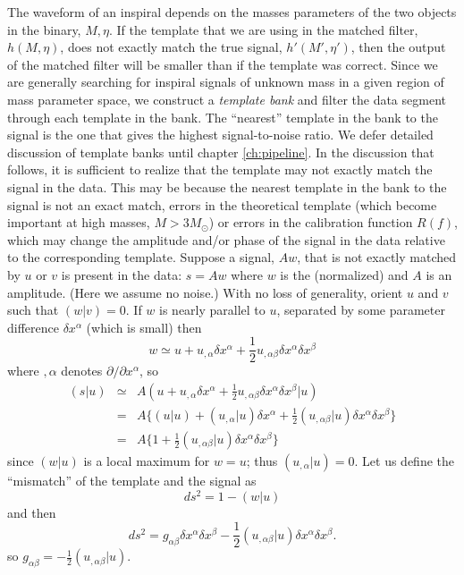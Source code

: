 The waveform of an inspiral depends on the masses parameters of the two
objects in the binary, $M,\eta$. If the template that we are using in the
matched filter, $h(M,\eta)$, does not exactly match the true signal,
$h'(M',\eta')$, then the output of the matched filter will be smaller than if
the template was correct. Since we are generally searching for inspiral
signals of unknown mass in a given region of mass parameter space, we
construct a \emph{template bank} and filter the data segment through each
template in the bank. The ``nearest'' template in the bank to the signal is
the one that gives the highest signal-to-noise ratio.  We defer detailed
discussion of template banks until chapter \ref{ch:pipeline}. In the
discussion that follows, it is sufficient to realize that the template may not
exactly match the signal in the data. This may be because the nearest template
in the bank to the signal is not an exact match, errors in the theoretical
template (which become important at high masses, $M > 3 M_\odot$) or errors in
the calibration function $R(f)$, which may change the amplitude and/or phase
of the signal in the data relative to the corresponding template. 
Suppose a signal, $Aw$, that is not exactly matched by $u$ or $v$ is present
in the data: $s=Aw$ where $w$ is the (normalized) and $A$ is an amplitude.
(Here we assume no noise.)  With no loss of generality, orient $u$ and $v$
such that $(w|v)=0$.  If $w$ is nearly parallel to $u$, separated by some
parameter difference $\delta x^\alpha$ (which is small) then
\begin{equation}
  w \simeq u + u_{,\alpha}\delta x^\alpha 
  + {\textstyle{\frac{1}{2}}}u_{,\alpha\beta}\delta x^\alpha\delta x^\beta
\end{equation}
where $,\alpha$ denotes $\partial/\partial x^\alpha$, so
\begin{eqnarray}
  (s|u) &\simeq& A(u + u_{,\alpha}\delta x^\alpha 
  + {\textstyle{\frac{1}{2}}} u_{,\alpha\beta}\delta x^\alpha\delta x^\beta|u)
  \nonumber\\
  &=& A\bigl\{ (u|u) + (u_{,\alpha}|u)\delta x^\alpha
  + {\textstyle{\frac{1}{2}}} (u_{,\alpha\beta}|u)\delta x^\alpha\delta x^\beta
  \bigr\}\nonumber\\
  &=& A\bigl\{ 1 +
  {\textstyle{\frac{1}{2}}} (u_{,\alpha\beta}|u)\delta x^\alpha\delta x^\beta
  \bigr\}
\end{eqnarray}
since $(w|u)$ is a local maximum for $w=u$; thus $(u_{,\alpha}|u)=0$.
Let us define the ``mismatch'' of the template and the signal as 
\begin{equation}
ds^2 = 1 - (w|u)
\end{equation}
and then
\begin{equation}
  ds^2 = g_{\alpha\beta}\delta x^\alpha\delta x^\beta
  - {\textstyle{\frac{1}{2}}} (u_{,\alpha\beta}|u)\delta x^\alpha\delta x^\beta.
\end{equation}
so $g_{\alpha\beta}=-{\textstyle{\frac{1}{2}}}(u_{,\alpha\beta}|u)$.

